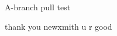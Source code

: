 \documentclass[a4 paper,12pt]{article}
\begin{document}
A-branch pull test　

thank you newxmith u r good
\end{document}
